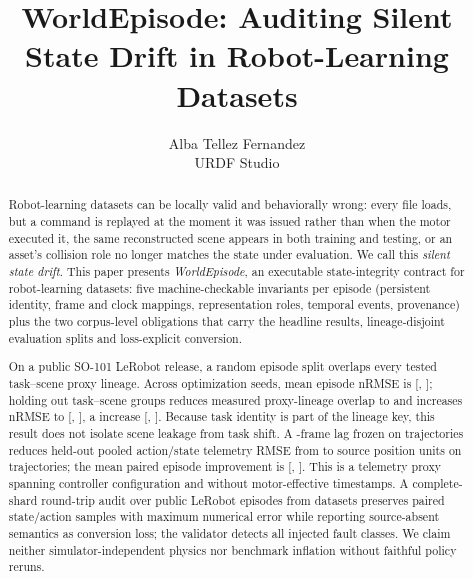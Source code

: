 \documentclass{article}
\title{WorldEpisode: Auditing Silent State Drift in Robot-Learning Datasets}
\author{
  Alba Tellez Fernandez\\
  URDF Studio
}
\date{}
\begin{document}
\maketitle

\begin{abstract}
Robot-learning datasets can be locally valid and behaviorally wrong: every file loads, but a
command is replayed at the moment it was issued rather than when the motor executed it, the same
reconstructed scene appears in both training and testing, or an asset's collision role no longer
matches the state under evaluation. We call this \emph{silent state drift}. This paper presents
\emph{WorldEpisode}, an executable state-integrity contract for robot-learning datasets: five
machine-checkable invariants per episode (persistent identity, frame and clock mappings,
representation roles, temporal events, provenance) plus the two corpus-level obligations that carry
the headline results, lineage-disjoint evaluation splits and loss-explicit conversion.

On a public SO-101 LeRobot release, a random episode split overlaps every tested task--scene proxy
lineage. Across \ExpMlpSeedCount{} optimization seeds, mean episode nRMSE is
\ExpMlpRandomNrmse{} [\ExpMlpRandomNrmseCiLow, \ExpMlpRandomNrmseCiHigh]; holding out
\ExpSceneHeldoutGroupCount{} task--scene groups reduces measured proxy-lineage overlap to
\ExpSceneHeldoutOverlap{} and increases nRMSE to \ExpMlpHeldoutNrmse{}
[\ExpMlpHeldoutNrmseCiLow, \ExpMlpHeldoutNrmseCiHigh], a
\ExpMlpNrmseDifference{} increase [\ExpMlpNrmseDifferenceCiLow,
\ExpMlpNrmseDifferenceCiHigh]. Because task identity is part of the lineage key, this result does
not isolate scene leakage from task shift. A \ExpTimingDelayFrames-frame lag frozen on
\ExpTimingCalibrationEpisodes{} trajectories reduces held-out pooled action/state telemetry RMSE
from \ExpTimingZeroRmse{} to \ExpTimingFrozenRmse{} source position units on
\ExpTimingHeldoutEpisodes{} trajectories; the mean paired episode improvement is
\ExpTimingImprovement{} [\ExpTimingImprovementCiLow, \ExpTimingImprovementCiHigh]. This is a
telemetry proxy spanning \ExpTimingControllerConfigurationCount{} controller configuration and
without motor-effective timestamps. A complete-shard round-trip audit
over \ExpConversionScaleEpisodeCount{} public LeRobot episodes from
\ExpConversionScaleDatasetCount{} datasets preserves \ExpConversionScaleRowCount{} paired
state/action samples with maximum numerical error \ExpConversionScaleMaxError{} while reporting
source-absent semantics as conversion loss; the validator detects all \ExpFaultCaseCount{} injected
fault classes. We claim neither simulator-independent physics nor benchmark inflation without
faithful policy reruns.
\end{abstract}
\end{document}
